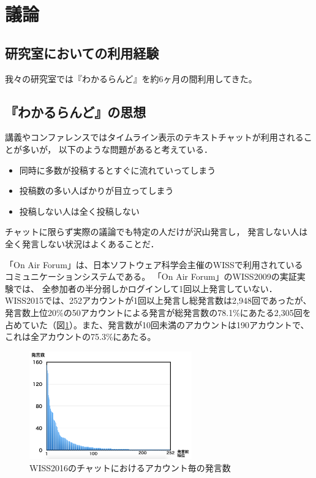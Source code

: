 \section{議論}

\subsection{研究室においての利用経験}
我々の研究室では『わかるらんど』を約6ヶ月の間利用してきた。

\subsection{『わかるらんど』の思想}

講義やコンファレンスではタイムライン表示のテキストチャットが利用されることが多いが，
以下のような問題があると考えている．

\begin{itemize}
\item 同時に多数が投稿するとすぐに流れていってしまう
\item 投稿数の多い人ばかりが目立ってしまう
\item 投稿しない人は全く投稿しない
\end{itemize}

チャットに限らず実際の議論でも特定の人だけが沢山発言し，
発言しない人は全く発言しない状況はよくあることだ．

「On Air Forum」は、日本ソフトウェア科学会主催のWISSで利用されている
コミュニケーションシステムである。
「On Air Forum」のWISS2009の実証実験\cite{nishida2011}では、
全参加者の半分弱しかログインして1回以上発言していない．
WISS2015では、252アカウントが1回以上発言し総発言数は2,948回であったが、発言数上位20\%の50アカウントによる発言が総発言数の78.1\%にあたる2,305回を占めていた（図\ref{wisschat}）。また、発言数が10回未満のアカウントは190アカウントで、これは全アカウントの75.3\%にあたる。

\begin{figure}[h]
\centering
\includegraphics[width=7cm]{images/wisschat.png}
\caption{WISS2016のチャットにおけるアカウント毎の発言数}
\label{wisschat}
\end{figure}

